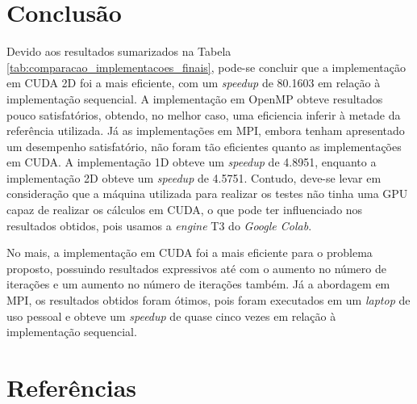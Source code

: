 \documentclass[12pt]{article}
\begin{document}
\section{Conclusão} \label{sec:conclusao}
Devido aos resultados sumarizados na Tabela \ref{tab:comparacao_implementacoes_finais}, pode-se concluir que a implementação em CUDA 2D foi a mais eficiente, com um \emph{speedup} de 80.1603 em relação à implementação sequencial. A implementação em OpenMP obteve resultados pouco satisfatórios, obtendo, no melhor caso, uma eficiencia inferir à metade da referência utilizada. Já as implementações em MPI, embora tenham apresentado um desempenho satisfatório, não foram tão eficientes quanto as implementações em CUDA. A implementação 1D obteve um \emph{speedup} de 4.8951, enquanto a implementação 2D obteve um \emph{speedup} de 4.5751. Contudo, deve-se levar em consideração que a máquina utilizada para realizar os testes não tinha uma GPU capaz de realizar os cálculos em CUDA, o que pode ter influenciado nos resultados obtidos, pois usamos a \emph{engine} T3 do \emph{Google Colab}.

No mais, a implementação em CUDA foi a mais eficiente para o problema proposto, possuindo resultados expressivos até com o aumento no número de iterações e um aumento no número de iterações também. Já a abordagem em MPI, os resultados obtidos foram ótimos, pois foram executados em um \emph{laptop} de uso pessoal e obteve um \emph{speedup} de quase cinco vezes em relação à implementação sequencial.
\section{Referências} \label{sec:referencias}


\end{document}

